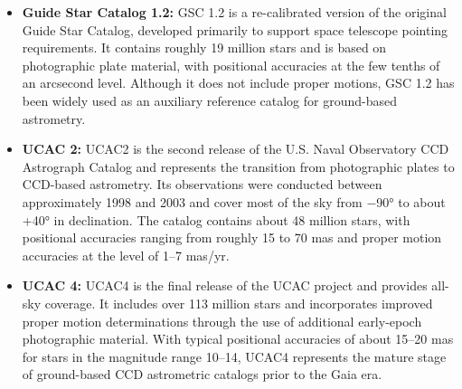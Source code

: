 \documentclass{aastex701}
\begin{document}
\begin{itemize}
    \item \textbf{Guide Star Catalog 1.2:} \label{subsubsec:gsc12} GSC 1.2 is a re-calibrated version of the original Guide Star Catalog, developed primarily to support space telescope pointing requirements. It contains roughly 19 million stars and is based on photographic plate material, with positional accuracies at the few tenths of an arcsecond level. Although it does not include proper motions, GSC 1.2 has been widely used as an auxiliary reference catalog for ground-based astrometry.

    \item \textbf{UCAC 2:} \label{subsubsec:ucac2} UCAC2 is the second release of the U.S. Naval Observatory CCD Astrograph Catalog and represents the transition from photographic plates to CCD-based astrometry. Its observations were conducted between approximately 1998 and 2003 and cover most of the sky from −90° to about +40° in declination. The catalog contains about 48 million stars, with positional accuracies ranging from roughly 15 to 70 mas and proper motion accuracies at the level of 1–7 mas/yr.

    \item \textbf{UCAC 4:} \label{subsubsec:ucac4} UCAC4 is the final release of the UCAC project and provides all-sky coverage. It includes over 113 million stars and incorporates improved proper motion determinations through the use of additional early-epoch photographic material. With typical positional accuracies of about 15–20 mas for stars in the magnitude range 10–14, UCAC4 represents the mature stage of ground-based CCD astrometric catalogs prior to the Gaia era.
\end{itemize}
\end{document}
